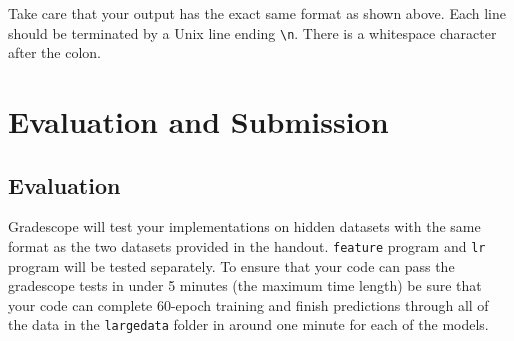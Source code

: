 \documentclass[11pt,addpoints,answers]{exam}
\begin{document}
Take care that your output has the exact same format as shown above. Each line should be terminated by a Unix line ending \lstinline{\n}. There is a whitespace character after the colon.

\section{Evaluation and Submission}

\subsection{Evaluation}

Gradescope will test your implementations on hidden datasets with the same format as the two datasets provided in the handout. \lstinline{feature} program and \lstinline{lr} program will be tested separately. To ensure that your code can pass the gradescope tests in under 5 minutes (the maximum time length) be sure that your code can complete 60-epoch training and finish predictions through all of the data in the \lstinline{largedata} folder in around one minute for each of the models.
\end{document}
